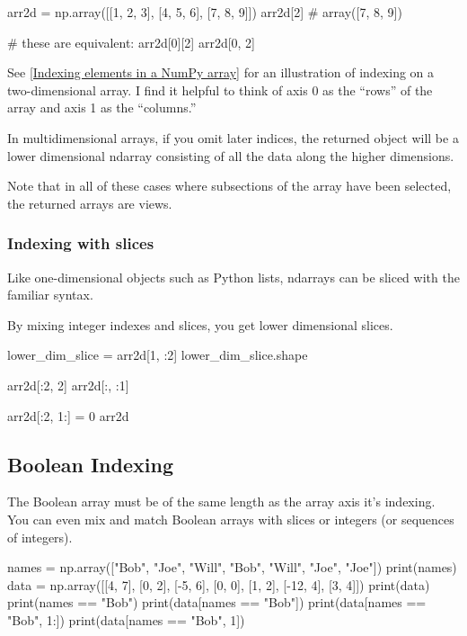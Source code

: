 \begin{pyc}
arr2d = np.array([[1, 2, 3], [4, 5, 6], [7, 8, 9]])
arr2d[2]
# array([7, 8, 9])

# these are equivalent:
arr2d[0][2]
arr2d[0, 2]
\end{pyc}

See \autoref{Indexing elements in a NumPy array} for an illustration of indexing on a two-dimensional array. I find it helpful to think of axis 0 as the “rows” of the array and axis 1 as the “columns.”


In multidimensional arrays, if you omit later indices, the returned object will be a
lower dimensional ndarray consisting of all the data along the higher dimensions. 

\begin{pyc}
    
\end{pyc}

Note that in all of these cases where subsections of the array have been selected, the
returned arrays are views.

\subsubsection{Indexing with slices}
Like one-dimensional objects such as Python lists, ndarrays can be sliced with the
familiar syntax.

By mixing integer indexes and slices, you get lower dimensional slices.


\begin{pyc}
lower_dim_slice = arr2d[1, :2]
lower_dim_slice.shape

arr2d[:2, 2]
arr2d[:, :1]

arr2d[:2, 1:] = 0
arr2d
\end{pyc}
\subsection{Boolean Indexing}
The Boolean array must be of the same length as the array axis it’s indexing. You can even mix and match Boolean arrays with slices or integers (or sequences of integers).

\begin{pyc}
names = np.array(["Bob", "Joe", "Will", "Bob", "Will", "Joe", "Joe"])
print(names)
data = np.array([[4, 7], [0, 2], [-5, 6], [0, 0], [1, 2], [-12, 4], [3, 4]])
print(data)
print(names == "Bob")
print(data[names == "Bob"])
print(data[names == "Bob", 1:])
print(data[names == "Bob", 1])
\end{pyc}

